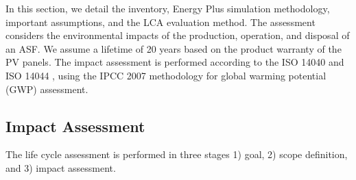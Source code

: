 
In this section, we detail the inventory, Energy Plus simulation methodology, important assumptions, and the LCA evaluation method. The assessment considers the environmental impacts of the production, operation, and disposal of an ASF. We assume a lifetime of 20 years based on the product warranty of the PV panels. The impact assessment is performed according to the ISO 14040 and ISO 14044 \cite{finkbeiner2006new}, using the IPCC 2007 methodology \cite{solomon2007climate} for global warming potential (GWP) assessment.\\

\subsection{Impact Assessment}
The life cycle assessment is performed in three stages 1) goal, 2) scope definition, and 3) impact assessment.

